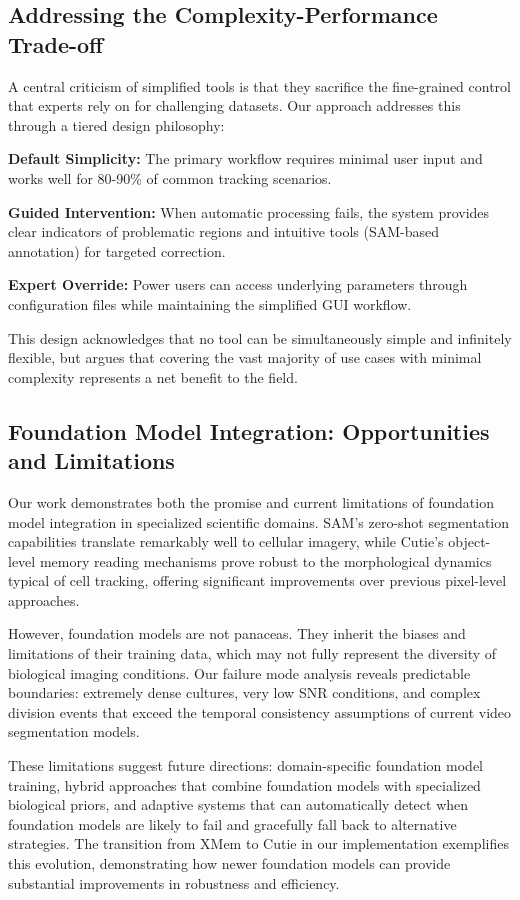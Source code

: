 \documentclass[12pt]{article}
\begin{document}
\subsection{Addressing the Complexity-Performance Trade-off}

A central criticism of simplified tools is that they sacrifice the fine-grained control that experts rely on for challenging datasets. Our approach addresses this through a tiered design philosophy:

\textbf{Default Simplicity:} The primary workflow requires minimal user input and works well for 80-90\% of common tracking scenarios.

\textbf{Guided Intervention:} When automatic processing fails, the system provides clear indicators of problematic regions and intuitive tools (SAM-based annotation) for targeted correction.

\textbf{Expert Override:} Power users can access underlying parameters through configuration files while maintaining the simplified GUI workflow.

This design acknowledges that no tool can be simultaneously simple and infinitely flexible, but argues that covering the vast majority of use cases with minimal complexity represents a net benefit to the field.

\subsection{Foundation Model Integration: Opportunities and Limitations}

Our work demonstrates both the promise and current limitations of foundation model integration in specialized scientific domains. SAM's zero-shot segmentation capabilities translate remarkably well to cellular imagery, while Cutie's object-level memory reading mechanisms prove robust to the morphological dynamics typical of cell tracking, offering significant improvements over previous pixel-level approaches.

However, foundation models are not panaceas. They inherit the biases and limitations of their training data, which may not fully represent the diversity of biological imaging conditions. Our failure mode analysis reveals predictable boundaries: extremely dense cultures, very low SNR conditions, and complex division events that exceed the temporal consistency assumptions of current video segmentation models.

These limitations suggest future directions: domain-specific foundation model training, hybrid approaches that combine foundation models with specialized biological priors, and adaptive systems that can automatically detect when foundation models are likely to fail and gracefully fall back to alternative strategies. The transition from XMem to Cutie in our implementation exemplifies this evolution, demonstrating how newer foundation models can provide substantial improvements in robustness and efficiency.
\end{document}

